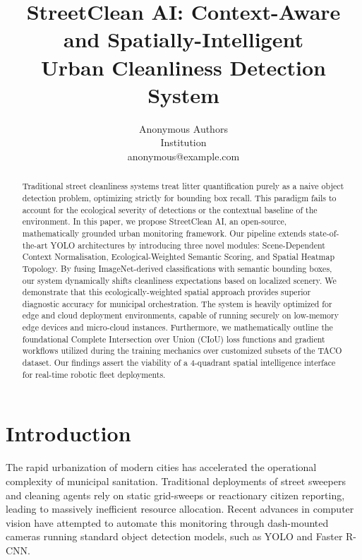 \documentclass[10pt,twocolumn,letterpaper]{article}
\begin{document}
\title{StreetClean AI: Context-Aware and Spatially-Intelligent \\ Urban Cleanliness Detection System}

\author{Anonymous Authors\\
Institution\\
anonymous@example.com
}

\maketitle

\begin{abstract}
Traditional street cleanliness systems treat litter quantification purely as a naive object detection problem, optimizing strictly for bounding box recall. This paradigm fails to account for the ecological severity of detections or the contextual baseline of the environment. In this paper, we propose StreetClean AI, an open-source, mathematically grounded urban monitoring framework. Our pipeline extends state-of-the-art YOLO architectures by introducing three novel modules: Scene-Dependent Context Normalisation, Ecological-Weighted Semantic Scoring, and Spatial Heatmap Topology. By fusing ImageNet-derived classifications with semantic bounding boxes, our system dynamically shifts cleanliness expectations based on localized scenery. We demonstrate that this ecologically-weighted spatial approach provides superior diagnostic accuracy for municipal orchestration. The system is heavily optimized for edge and cloud deployment environments, capable of running securely on low-memory edge devices and micro-cloud instances. Furthermore, we mathematically outline the foundational Complete Intersection over Union (CIoU) loss functions and gradient workflows utilized during the training mechanics over customized subsets of the TACO dataset. Our findings assert the viability of a 4-quadrant spatial intelligence interface for real-time robotic fleet deployments.
\end{abstract}

\section{Introduction}
The rapid urbanization of modern cities has accelerated the operational complexity of municipal sanitation. Traditional deployments of street sweepers and cleaning agents rely on static grid-sweeps or reactionary citizen reporting, leading to massively inefficient resource allocation. Recent advances in computer vision have attempted to automate this monitoring through dash-mounted cameras running standard object detection models, such as YOLO and Faster R-CNN. 
\end{document}
